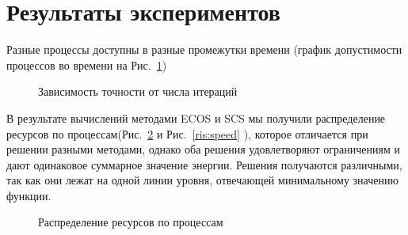 \documentclass{article}
\begin{document}
\section{Результаты экспериментов}

Разные процессы доступны в разные промежутки времени (график допустимости процессов во времени на Рис.~\ref{ris:sched})

\begin{figure}[h]
\caption{Зависимость точности от числа итераций}
\label{ris:sched}
\end{figure}

В результате вычислений методами ECOS и SCS мы получили распределение ресурсов по процессам(Рис.~\ref{ris:pow} и Рис.~\ref{ris:speed} ), которое  отличается при решении разными методами, однако оба решения удовлетворяют ограничениям и дают одинаковое суммарное значение энергии. Решения получаются различными, так как они лежат на одной линии уровня, отвечающей минимальному значению функции.\\

\begin{figure}[h]
\caption{Распределение ресурсов по процессам}
\label{ris:pow}
\end{figure}
\end{document}
